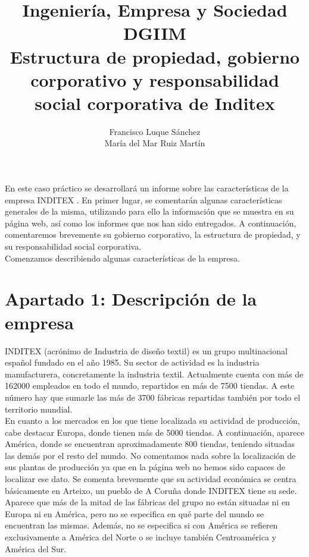 \documentclass[11pt]{article}
\theoremstyle{plain}
\theoremstyle{definition}
\begin{document}
\title{Ingeniería, Empresa y Sociedad \\
  DGIIM \\
  \large Estructura de propiedad, gobierno corporativo y
  responsabilidad social corporativa de Inditex}
\author{Francisco Luque Sánchez\\
  María del Mar Ruiz Martín}
\maketitle

En este caso práctico se desarrollará un informe sobre las
características de la empresa INDITEX \cite{inditex}. En primer lugar,
se comentarán algunas características generales de la misma,
utilizando para ello la información que se muestra en su página web,
así como los informes que nos han sido entregados. A continuación,
comentaremos brevemente su gobierno corporativo, la estructura de
propiedad, y su responsabilidad social corporativa.\\

Comenzamos describiendo algunas características de la empresa.

\section*{Apartado 1: Descripción de la empresa}

INDITEX (acrónimo de Industria de diseño textil) es un grupo
multinacional español fundado en el año 1985. Su sector de actividad
es la industria manufacturera, concretamente la industria
textil. Actualmente cuenta con más de 162000 empleados en todo el
mundo, repartidos en más de 7500 tiendas. A este número hay que
sumarle las más de 3700 fábricas repartidas también por todo el
territorio mundial.\\

En cuanto a los mercados en los que tiene localizada su actividad de
producción, cabe destacar Europa, donde tienen más de 5000 tiendas. A
continuación, aparece América, donde se encuentran aproximadamente 800
tiendas, teniendo situadas las demás por el resto del mundo. No
comentamos nada sobre la localización de sus plantas de producción ya
que en la página web no hemos sido capaces de localizar ese dato. Se
comenta brevemente que su actividad económica se centra básicamente en
Arteixo, un pueblo de A Coruña donde INDITEX tiene su sede. Aparece
que más de la mitad de las fábricas del grupo no están situadas ni en
Europa ni en América, pero no se especifica en qué parte del mundo se
encuentran las mismas. Además, no se especifica si con América se
refieren exclusivamente a América del Norte o se incluye también
Centroamérica y
América del Sur.\\
\end{document}
